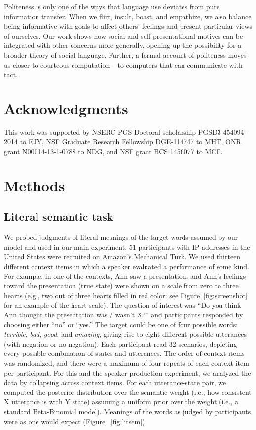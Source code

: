 \documentclass[floatsintext,man]{apa6}
\theoremstyle{definition}
\theoremstyle{definition}
\theoremstyle{definition}
\theoremstyle{remark}
\begin{document}
Politeness is only one of the ways that language use deviates from pure
information transfer. When we flirt, insult, boast, and empathize, we
also balance being informative with goals to affect others' feelings and
present particular views of ourselves. Our work shows how social and
self-presentational motives can be integrated with other concerns more
generally, opening up the possibility for a broader theory of social
language. Further, a formal account of politeness moves us closer to
courteous computation -- to computers that can communicate with tact.

\section{Acknowledgments}\label{acknowledgments}

This work was supported by NSERC PGS Doctoral scholarship
PGSD3-454094-2014 to EJY, NSF Graduate Research Fellowship DGE-114747 to
MHT, ONR grant N00014-13-1-0788 to NDG, and NSF grant BCS 1456077 to
MCF.

\newpage

\section{Methods}\label{methods}

\subsection{Literal semantic task}\label{literal-semantic-task}

We probed judgments of literal meanings of the target words assumed by
our model and used in our main experiment. 51 participants with IP
addresses in the United States were recruited on Amazon's Mechanical
Turk. We used thirteen different context items in which a speaker
evaluated a performance of some kind. For example, in one of the
contexts, Ann saw a presentation, and Ann's feelings toward the
presentation (true state) were shown on a scale from zero to three
hearts (e.g., two out of three hearts filled in red color; see
Figure~\ref{fig:screenshot} for an example of the heart scale). The
question of interest was \enquote{Do you think Ann thought the
presentation was / wasn't X?} and participants responded by choosing
either \enquote{no} or \enquote{yes.} The target could be one of four
possible words: \emph{terrible}, \emph{bad}, \emph{good}, and
\emph{amazing}, giving rise to eight different possible utterances (with
negation or no negation). Each participant read 32 scenarios, depicting
every possible combination of states and utterances. The order of
context items was randomized, and there were a maximum of four repeats
of each context item per participant. For this and the speaker
production experiment, we analyzed the data by collapsing across context
items. For each utterance-state pair, we computed the posterior
distribution over the semantic weight (i.e., how consistent X utterance
is with Y state) assuming a uniform prior over the weight (i.e., a
standard Beta-Binomial model). Meanings of the words as judged by
participants were as one would expect (Figure ~\ref{fig:litsem}).
\end{document}
